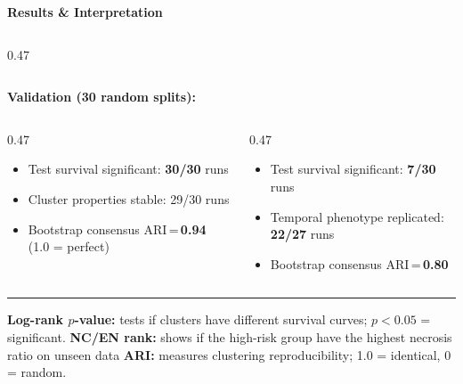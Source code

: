 \documentclass[aspectratio=169, 10pt]{beamer}
\begin{document}
\begin{frame}{\textbf{Results \& Interpretation}}
\begin{columns}[T]
\begin{column}{0.47\textwidth}
\end{column}
\end{columns}

\vspace{0.1cm}
\begin{center}
\textbf{Validation (30 random splits):}
\end{center}
\vspace{-0.4cm}

\begin{columns}[T]
\begin{column}{0.47\textwidth}
\begin{itemize}
    \item Test survival significant: \textcolor{GoodGreen}{\textbf{30/30}} runs
    \item Cluster properties stable: \textcolor{GoodGreen}{29/30} runs
    \item Bootstrap consensus ARI\,=\,\textbf{0.94} {\scriptsize(1.0 = perfect)}
\end{itemize}
\end{column}
\begin{column}{0.47\textwidth}  
\begin{itemize}
    \item Test survival significant: \textcolor{WarnOrange}{\textbf{7/30}} runs
    \item Temporal phenotype replicated: \textcolor{GoodGreen}{\textbf{22/27}} runs
    \item Bootstrap consensus ARI\,=\,\textbf{0.80}
\end{itemize}
\end{column}
\end{columns}

\vspace{0.1cm}
\rule{\textwidth}{0.3pt}
{\footnotesize
\textbf{Log-rank $p$-value:} tests if clusters have different survival curves; $p < 0.05$ = significant.\;
\textbf{NC/EN rank:} shows if the high-risk group have the highest necrosis ratio on unseen data\;
\textbf{ARI:} measures clustering reproducibility; 1.0 = identical, 0 = random.
}

\vspace{0.08cm}

\end{frame}
\end{document}

